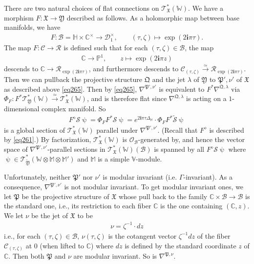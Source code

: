 \documentclass[12pt,a4paper,notitlepage]{report}
\theoremstyle{definition}
\theoremstyle{plain}
\newcommand{\fk}{\mathfrak}
\newcommand{\mc}{\mathcal}
\newcommand{\wtd}{\widetilde}
\newcommand{\scr}{\mathscr}
\newcommand{\im}{\mathbf{i}}
\newcommand{\mbb}{\mathbb}
\newcommand{\Vbb}{\mathbb V}
\newcommand{\Wbb}{\mathbb W}
\newcommand{\Mbb}{\mathbb M}
\newcommand{\Cbb}{\mathbb C}
\newcommand{\Pbb}{\mathbb P}
\numberwithin{equation}{section}
\begin{document}
There are two natural choices of flat connections on $\scr T_{\fk X}^*(\Wbb)$. We have a morphism $F:\fk X\rightarrow\fk Y$ described as follows. As a holomorphic map between base manifolds, we have
\begin{gather*}
F:\mc B=\mbb H\times\Cbb^\times\rightarrow \mc D_1^\times,\qquad (\tau,\zeta)\mapsto \exp(2\im\pi\tau).
\end{gather*}
The map $F:\mc C\rightarrow\mc R$ is defined such that  for each $(\tau,\zeta)\in\mc B$, the map 
\begin{align*}
\Cbb\rightarrow\Pbb^1,\qquad z\mapsto \exp(2\im\pi z)
\end{align*}
descends to $\Cbb\rightarrow \mc R_{\exp(2\im\pi\tau)}$, and furthermore descends to $\mc C_{(\tau,\zeta)}\xrightarrow{\simeq}\mc R_{\exp(2\im\pi\tau)}$. Then we can pullback the projective structure $\fk Q$ and the jet $\lambda$ of $\fk Y$ to $\fk P',\nu'$ of $\fk X$ as described above \eqref{eq265}. Then by \eqref{eq265}, $\nabla^{\fk P',\nu'}$ is equivalent to $F^*\nabla^{\fk Q,\lambda}$ via $\Phi_F:F^*\scr T_{\fk Y}^*(\Wbb)\xrightarrow{\simeq}\scr T_{\fk X}^*(\Wbb)$, and is therefore flat since $\nabla^{\fk Q,\lambda}$ is acting on a $1$-dimensional complex manifold. So 
\begin{align*}
F^\diamond\mc S\uppsi=\Phi_F F^*\mc S\uppsi=e^{2\im\pi\tau\Delta_\Mbb}\cdot \Phi_F F^*\wtd{\mc S}\uppsi
\end{align*}
is a global section of $\scr T_{\fk X}^*(\Wbb)$ parallel under $\nabla^{\fk P',\nu'}$. (Recall that $F^\diamond$ is described by \eqref{eq261}.) By factorization, $\scr T_{\fk X}^*(\Wbb)$ is $\scr O_{\mc B}$-generated by, and hence the  vector space of $\nabla^{\fk P',\nu'}$-parallel sections in $\scr T_{\fk X}^*(\Wbb)(\mc B)$ is spanned by all $F^\diamond\mc S\uppsi$ where $\uppsi\in\scr T_{\wtd{\fk Y}}^*(\Wbb\otimes\Mbb\otimes\Mbb')$ and $\Mbb$ is a simple $\Vbb$-module.



Unfortunately, neither $\fk P'$ nor $\nu'$ is modular invariant (i.e. $\Gamma$-invariant). As a consequence, $\nabla^{\fk P',\nu'}$ is not modular invariant. To get modular invariant ones, we let $\fk P$ be the projective structure of $\fk X$ whose pull back to the family $\Cbb\times\mc B\rightarrow\mc B$ is the standard one, i.e., its restriction to each fiber $\Cbb$ is the one containing $(\Cbb,z)$. We let $\nu$ be the jet of $\fk X$ to be 
\begin{align*}
\nu=\zeta^{-1}\cdot dz
\end{align*}
i.e., for each $(\tau,\zeta)\in\mc B$, $\nu(\tau,\zeta)$ is the cotangent vector $\zeta^{-1} dz$ of the fiber $\mc C_{(\tau,\zeta)}$ at $0$ (when lifted to $\Cbb$) where $dz$ is defined by the standard coordinate $z$ of $\Cbb$. Then both $\fk P$ and $\nu$ are modular invariant. So is $\nabla^{\fk P,\nu}$.
\end{document}
